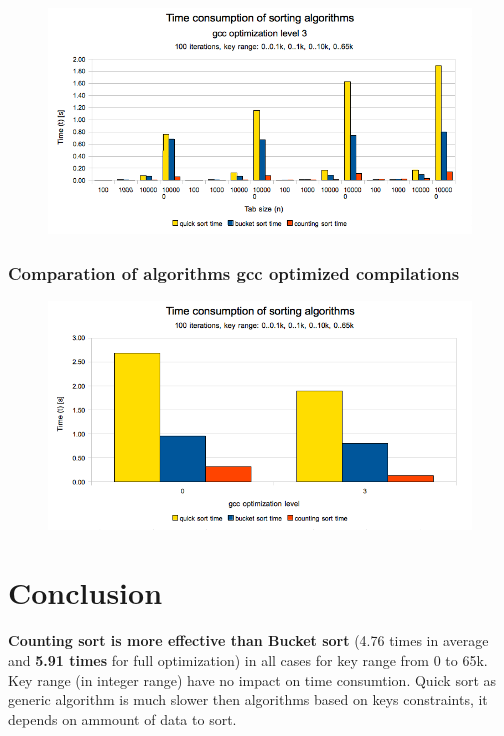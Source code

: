 \documentclass[12pt]{article}
\begin{document}
\begin{figure}[H]
    \centering
    \includegraphics[width=1\textwidth]{compare-gcc-opt3}
\end{figure}

\subsubsection{Comparation of algorithms gcc optimized compilations}

\begin{figure}[H]
    \centering
    \includegraphics[width=1\textwidth]{compare-gcc-opt-0and3}
\end{figure}

\section{Conclusion}

\textbf{Counting sort is more effective than Bucket sort} (4.76 times in average and \textbf{5.91 times} for full optimization) in all cases for key range from 0 to 65k. Key range (in integer range) have no impact on time consumtion. Quick sort as generic algorithm is much slower then algorithms based on keys constraints, it depends on ammount of data to sort.
\end{document}
